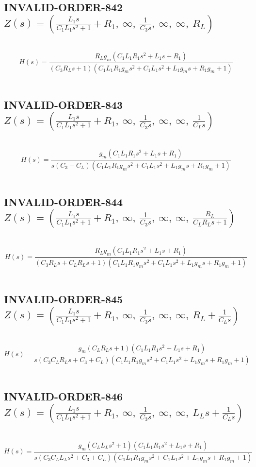\documentclass{article}
\begin{document}
\subsection{INVALID-ORDER-842 $Z(s) = \left( \frac{L_{1} s}{C_{1} L_{1} s^{2} + 1} + R_{1}, \  \infty, \  \frac{1}{C_{3} s}, \  \infty, \  \infty, \  R_{L}\right)$ } \ 
\textbf{\[H(s) = \frac{R_{L} g_{m} \left(C_{1} L_{1} R_{1} s^{2} + L_{1} s + R_{1}\right)}{\left(C_{3} R_{L} s + 1\right) \left(C_{1} L_{1} R_{1} g_{m} s^{2} + C_{1} L_{1} s^{2} + L_{1} g_{m} s + R_{1} g_{m} + 1\right)}\] } \ 
\subsection{INVALID-ORDER-843 $Z(s) = \left( \frac{L_{1} s}{C_{1} L_{1} s^{2} + 1} + R_{1}, \  \infty, \  \frac{1}{C_{3} s}, \  \infty, \  \infty, \  \frac{1}{C_{L} s}\right)$ } \ 
\textbf{\[H(s) = \frac{g_{m} \left(C_{1} L_{1} R_{1} s^{2} + L_{1} s + R_{1}\right)}{s \left(C_{3} + C_{L}\right) \left(C_{1} L_{1} R_{1} g_{m} s^{2} + C_{1} L_{1} s^{2} + L_{1} g_{m} s + R_{1} g_{m} + 1\right)}\] } \ 
\subsection{INVALID-ORDER-844 $Z(s) = \left( \frac{L_{1} s}{C_{1} L_{1} s^{2} + 1} + R_{1}, \  \infty, \  \frac{1}{C_{3} s}, \  \infty, \  \infty, \  \frac{R_{L}}{C_{L} R_{L} s + 1}\right)$ } \ 
\textbf{\[H(s) = \frac{R_{L} g_{m} \left(C_{1} L_{1} R_{1} s^{2} + L_{1} s + R_{1}\right)}{\left(C_{3} R_{L} s + C_{L} R_{L} s + 1\right) \left(C_{1} L_{1} R_{1} g_{m} s^{2} + C_{1} L_{1} s^{2} + L_{1} g_{m} s + R_{1} g_{m} + 1\right)}\] } \ 
\subsection{INVALID-ORDER-845 $Z(s) = \left( \frac{L_{1} s}{C_{1} L_{1} s^{2} + 1} + R_{1}, \  \infty, \  \frac{1}{C_{3} s}, \  \infty, \  \infty, \  R_{L} + \frac{1}{C_{L} s}\right)$ } \ 
\textbf{\[H(s) = \frac{g_{m} \left(C_{L} R_{L} s + 1\right) \left(C_{1} L_{1} R_{1} s^{2} + L_{1} s + R_{1}\right)}{s \left(C_{3} C_{L} R_{L} s + C_{3} + C_{L}\right) \left(C_{1} L_{1} R_{1} g_{m} s^{2} + C_{1} L_{1} s^{2} + L_{1} g_{m} s + R_{1} g_{m} + 1\right)}\] } \ 
\subsection{INVALID-ORDER-846 $Z(s) = \left( \frac{L_{1} s}{C_{1} L_{1} s^{2} + 1} + R_{1}, \  \infty, \  \frac{1}{C_{3} s}, \  \infty, \  \infty, \  L_{L} s + \frac{1}{C_{L} s}\right)$ } \ 
\textbf{\[H(s) = \frac{g_{m} \left(C_{L} L_{L} s^{2} + 1\right) \left(C_{1} L_{1} R_{1} s^{2} + L_{1} s + R_{1}\right)}{s \left(C_{3} C_{L} L_{L} s^{2} + C_{3} + C_{L}\right) \left(C_{1} L_{1} R_{1} g_{m} s^{2} + C_{1} L_{1} s^{2} + L_{1} g_{m} s + R_{1} g_{m} + 1\right)}\] } \ 
\end{document}
